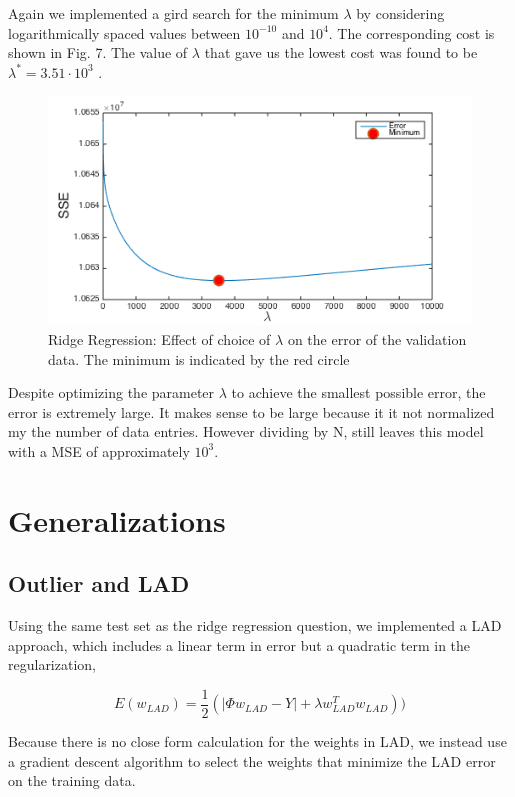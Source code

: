 \documentclass[10pt,twocolumn]{article}
\begin{document}
Again we implemented a gird search for the minimum $\lambda$ by considering logarithmically spaced values between $10^{-10}$ and $10^4$. The corresponding cost is shown in Fig. 7. The value of $\lambda $ that gave us the lowest cost was found to be $\lambda ^* = 3.51 \cdot 10^3 $ . 
\begin{figure}[H]
\center
\includegraphics[scale =.4]{3_3.png}
\caption{Ridge Regression: Effect of choice of $\lambda$ on the error of the validation data.  The minimum is indicated by the red circle}
\end{figure}


Despite optimizing the parameter $\lambda$ to achieve the smallest possible error,  the error is extremely large. It makes sense to be large because it it not normalized my the number of data entries. However dividing by N, still leaves this model with a MSE of approximately $10^3$. 

\section{Generalizations}
\subsection*{Outlier and LAD}

Using the same test set as the ridge regression question, we implemented a LAD approach, which includes a linear term in error but a quadratic term in the regularization, 

\begin{equation}
E(w_{LAD}) = \frac{1}{2}(|\Phi w_{LAD}  -Y| + \lambda w_{LAD}^T w_{LAD}))
\end{equation}


Because there is no close form calculation for the weights in LAD, we instead use a gradient descent algorithm to select the weights that minimize the LAD error on the training data. 
\end{document}
